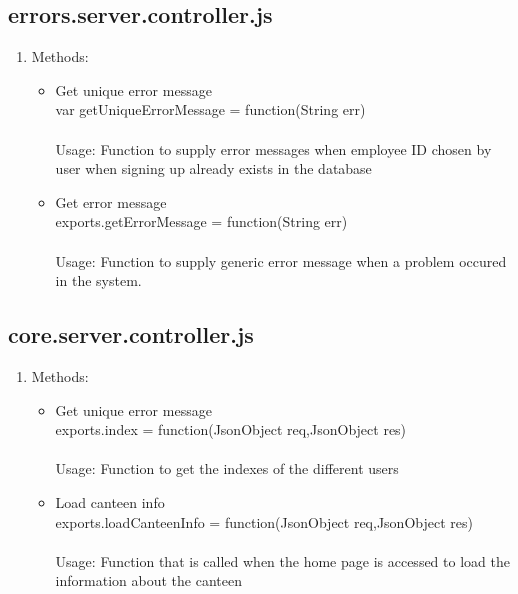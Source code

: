 \documentclass[a4paper,12pt]{report}
\begin{document}
\subsection{errors.server.controller.js}
\begin{enumerate}
	\item Methods:
	\begin{itemize}
		\item Get unique error message \\ var getUniqueErrorMessage = function(String err) \\ \\
		Usage: Function to supply error messages when employee ID chosen by user when signing up already exists in the database
		\item Get error message \\ exports.getErrorMessage = function(String err) 
		\\ \\ Usage: Function to supply generic error message when a problem occured in the system.
	\end{itemize}
\end{enumerate}

\subsection{core.server.controller.js}
\begin{enumerate}
	\item Methods:
	\begin{itemize}
		\item Get unique error message \\ exports.index = function(JsonObject req,JsonObject  res) 
		\\ \\ Usage: Function to get the indexes of the different users 
		\item Load canteen info \\ exports.loadCanteenInfo = function(JsonObject req,JsonObject  res)
		\\ \\ Usage: Function that is called when the home page is accessed to load the information about the canteen
	\end{itemize}
\end{enumerate}
\end{document}
